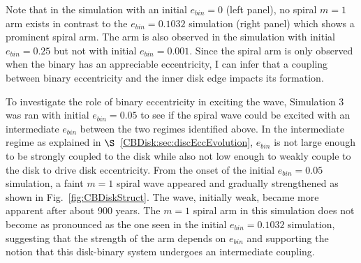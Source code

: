 Note that in the simulation with an initial $e_{bin} = 0$ (left panel), no spiral $m = 1$ 
arm exists in contrast to the $e_{bin} = 0.1032$ simulation (right panel) which
shows a prominent spiral arm.  The arm is also observed in the
simulation with initial $e_{bin} = 0.25$ but not with initial $e_{bin}
= 0.001$.  Since the spiral arm is only observed when the binary has
an appreciable eccentricity, I can infer that a coupling between binary eccentricity
and the inner disk edge impacts its formation.  

To investigate the role of binary eccentricity in exciting the wave, Simulation 3 was ran with initial $e_{bin} = 0.05$ to see if the spiral wave could be excited with an intermediate $e_{bin}$ between the two regimes identified above.  In the intermediate regime as explained in $\S$~\ref{CBDisk:sec:discEccEvolution}, $e_{bin}$ is not large enough to be strongly coupled to the disk while also not low enough to weakly couple to the disk to drive disk eccentricity.  From the onset of the initial $e_{bin} = 0.05$ simulation, a faint $m = 1$ spiral wave appeared and gradually strengthened as shown in Fig.~\ref{fig:CBDiskStruct}.  The wave, initially weak, became more apparent after about 900 years.  The $m = 1$ spiral arm in this simulation does not become as pronounced as the one seen in the initial $e_{bin} = 0.1032$ simulation, suggesting that the strength of the arm depends on $e_{bin}$ and supporting the notion that this disk-binary system undergoes an intermediate coupling.  

